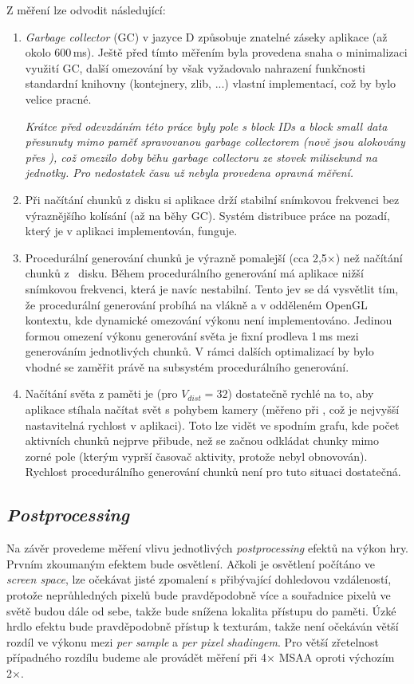 \noindent Z měření lze odvodit následující:
\begin{enumerate}
	\item \textit{Garbage collector} (GC) v jazyce D způsobuje znatelné záseky aplikace (až okolo 600\,ms). Ještě před tímto měřením byla provedena snaha o minimalizaci využití GC, další omezování by však vyžadovalo nahrazení funkčnosti standardní knihovny (kontejnery, zlib, ...) vlastní implementací, což by bylo velice pracné.
	
	\textit{Krátce před odevzdáním této práce byly pole s \textit{block IDs} a \textit{block small data} přesunuty mimo paměť spravovanou \textit{garbage collectorem} (nově jsou alokovány přes ), což omezilo doby běhu \textit{garbage collectoru} ze stovek milisekund na jednotky. Pro nedostatek času už nebyla provedena opravná měření.}
	\item Při načítání chunků z disku si aplikace drží stabilní snímkovou frekvenci bez výraznějšího kolísání (až na běhy GC). Systém distribuce práce na pozadí, který je v aplikaci implementován, funguje.
	\item Procedurální generování chunků je výrazně pomalejší (cca 2,5×) než načítání chunků z~ disku. Během procedurálního generování má aplikace nižší snímkovou frekvenci, která je navíc nestabilní. Tento jev se dá vysvětlit tím, že procedurální generování probíhá na vlákně a v odděleném OpenGL kontextu, kde dynamické omezování výkonu není implementováno. Jedinou formou omezení výkonu generování světa je fixní prodleva 1\,ms mezi generováním jednotlivých chunků. V rámci dalších optimalizací by bylo vhodné se zaměřit právě na subsystém procedurálního generování.
	\item Načítání světa z paměti je (pro $V_{dist} = 32$) dostatečně rychlé na to, aby aplikace stíhala načítat svět s pohybem kamery (měřeno při , což je nejvyšší nastavitelná rychlost v aplikaci). Toto lze vidět ve spodním grafu, kde počet aktivních chunků nejprve přibude, než se začnou odkládat chunky mimo zorné pole (kterým vyprší časovač aktivity, protože nebyl obnovován). Rychlost procedurálního generování chunků není pro tuto situaci dostatečná.
\end{enumerate}

\subsection{\textit{Postprocessing}}
Na závěr provedeme měření vlivu jednotlivých \textit{postprocessing} efektů na výkon hry. Prvním zkoumaným efektem bude osvětlení. Ačkoli je osvětlení počítáno ve \textit{screen space}, lze očekávat jisté zpomalení s přibývající dohledovou vzdáleností, protože neprůhledných pixelů bude pravděpodobně více a souřadnice pixelů ve světě budou dále od sebe, takže bude snížena lokalita přístupu do paměti. Úzké hrdlo efektu bude pravděpodobně přístup k texturám, takže není očekáván větší rozdíl ve výkonu mezi \textit{per sample} a \textit{per pixel} \textit{shadingem}. Pro větší zřetelnost případného rozdílu budeme ale provádět měření při 4× MSAA oproti výchozím 2×.

